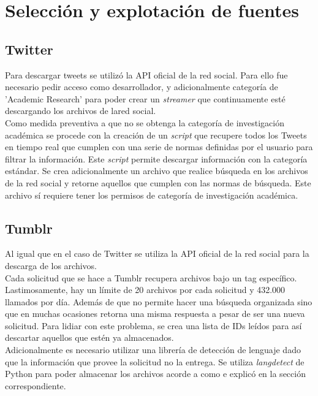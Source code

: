 \section{Selección y explotación de fuentes}

\subsection{Twitter}
Para descargar tweets se utilizó la API oficial de la red social. Para ello fue necesario pedir acceso como desarrollador, y adicionalmente categoría de 'Academic Research' para poder crear un \textit{streamer} que continuamente esté descargando los archivos de lared social.\\ 

Como medida preventiva a que no se obtenga la categoría de investigación académica se procede con la creación de un \textit{script} que recupere todos los Tweets en tiempo real que cumplen con una serie de normas definidas por el usuario para filtrar la información. Este \textit{script} permite descargar información con la categoría estándar. Se crea adicionalmente un archivo que realice búsqueda en los archivos de la red social y retorne aquellos que cumplen con las normas de búsqueda. Este archivo sí requiere tener los permisos de categoría de investigación académica.

\subsection{Tumblr}
Al igual que en el caso de Twitter se utiliza la API oficial de la red social para la descarga de los archivos.\\

Cada solicitud que se hace a Tumblr recupera archivos bajo un tag específico. Lastimosamente, hay un límite de 20 archivos por cada solicitud y 432.000 llamados por día. Además de que no permite hacer una búsqueda organizada sino que en muchas ocasiones retorna una misma respuesta a pesar de ser una nueva solicitud. Para lidiar con este problema, se crea una lista de IDs leídos para así descartar aquellos que estén ya almacenados.\\ 

Adicionalmente es necesario utilizar una librería de detección de lenguaje dado que la información que provee la solicitud no la entrega. Se utiliza \textit{langdetect} de Python para poder almacenar los archivos acorde a como e explicó en la sección correspondiente.